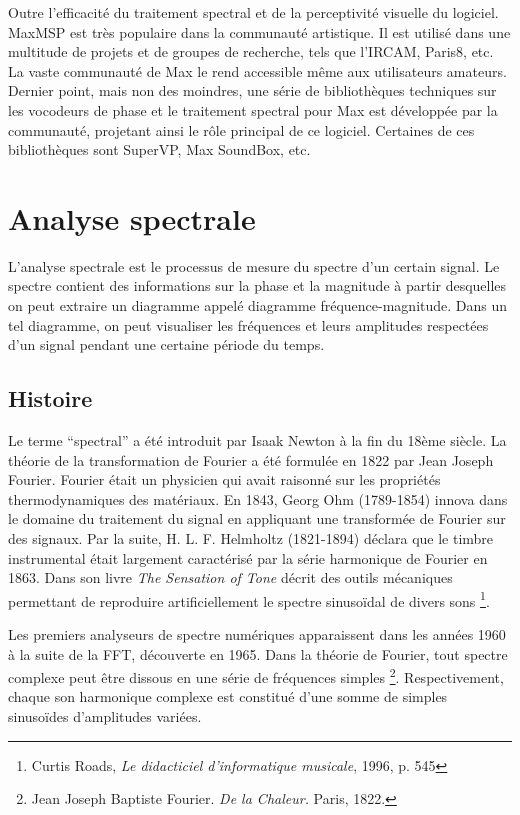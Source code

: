 Outre l'efficacité du traitement spectral et de la perceptivité visuelle du logiciel. MaxMSP est très populaire dans la communauté artistique. Il est utilisé dans une multitude de projets et de groupes de recherche, tels que l'IRCAM, Paris8, etc. La vaste communauté de Max le rend accessible même aux utilisateurs amateurs. Dernier point, mais non des moindres, une série de bibliothèques techniques sur les vocodeurs de phase et le traitement spectral pour Max est développée par la communauté, projetant ainsi le rôle principal de ce logiciel. Certaines de ces bibliothèques sont SuperVP, Max SoundBox, etc.

\section{Analyse spectrale}

L'analyse spectrale est le processus de mesure du spectre d'un certain signal. Le spectre contient des informations sur la phase et la magnitude à partir desquelles on peut extraire un diagramme appelé diagramme fréquence-magnitude. Dans un tel diagramme, on peut visualiser les fréquences et leurs amplitudes respectées d’un signal pendant une certaine période du temps.

	\subsection{Histoire}

Le terme “spectral” a été introduit par Isaak Newton à la fin du 18ème siècle. La théorie de la transformation de Fourier a été formulée en 1822 par Jean Joseph Fourier. Fourier était un physicien qui avait raisonné sur les propriétés thermodynamiques des matériaux. En 1843, Georg Ohm (1789-1854) innova dans le domaine du traitement du signal en appliquant une transformée de Fourier sur des signaux. Par la suite, H. L. F. Helmholtz (1821-1894) déclara que le timbre instrumental était largement caractérisé par la série harmonique de Fourier en 1863. Dans son livre \textit{The Sensation of Tone} décrit des outils mécaniques permettant de reproduire artificiellement le spectre sinusoïdal de divers sons \footnote{ Curtis Roads, \textit{Le didacticiel d'informatique musicale}, 1996, p. 545 \nocite{Routes: 1996: CMT: 525484}}.

Les premiers analyseurs de spectre numériques apparaissent dans les années 1960 à la suite de la FFT, découverte en 1965. Dans la théorie de Fourier, tout spectre complexe peut être dissous en une série de fréquences simples \footnote{Jean Joseph Baptiste Fourier. \textit{De la Chaleur.} Paris, 1822.}. Respectivement, chaque son harmonique complexe est constitué d'une somme de simples sinusoïdes d'amplitudes variées.

